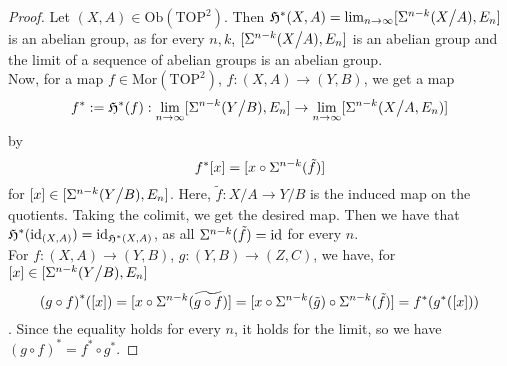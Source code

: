\documentclass[a4paper,11pt]{article}
\begin{document}
\begin{proof}
    Let \((X,A)\in\mathrm{Ob}(\mathrm{TOP}^2)\). Then \(\mathfrak{H}^\ast(X,A)=\lim_{n\to\infty}[\Sigma^{n-k}(X\big/A),E_n]\) is an abelian group, as for every \(n,k\), \([\Sigma^{n-k}(X\big/A),E_n]\) is an abelian group and the limit of a sequence of abelian groups is an abelian group.\\
    Now, for a map \(f\in\mathrm{Mor}(\mathrm{TOP}^2)\), \(f:(X,A)\to(Y,B)\), we get a map
    \[f^\ast:=\mathfrak{H}^\ast(f):\lim_{n\to\infty}[\Sigma^{n-k}(Y\big/B),E_n]\to\lim_{n\to\infty}[\Sigma^{n-k}(X\big/A,E_n)]\]
    by
    \[f^\ast [x]= [x\circ\Sigma^{n-k}(\tilde{f})]\]
    for \([x]\in[\Sigma^{n-k}(Y\big/B),E_n]\). Here, \(\tilde{f}:X\big/A\to Y\big/B\) is the induced map on the quotients.
    Taking the colimit, we get the desired map.
    Then we have that \(\mathfrak{H}^\ast(\mathrm{id}_{(X,A)})=\mathrm{id}_{\mathfrak{H}^\ast(X,A)}\), as all \(\Sigma^{n-k}(\tilde{f})=\mathrm{id}\) for every \(n\).\\
    For \(f:(X,A)\to(Y,B)\), \(g:(Y,B)\to(Z,C)\), we have, for \([x]\in[\Sigma^{n-k}(Y\big/B),E_n]\)
    \[{(g\circ f)}^\ast([x])=[x\circ\sus^{n-k}(\widetilde{g\circ f})]=[x\circ\sus^{n-k}(\tilde{g})\circ \sus^{n-k}(\tilde{f})]=%
    f^\ast(g^\ast([x]))\].
    Since the equality holds for every \(n\), it holds for the limit, so we have
    \({(g\circ f)}^\ast=f^\ast\circ g^\ast\).
\end{proof}
\end{document}
